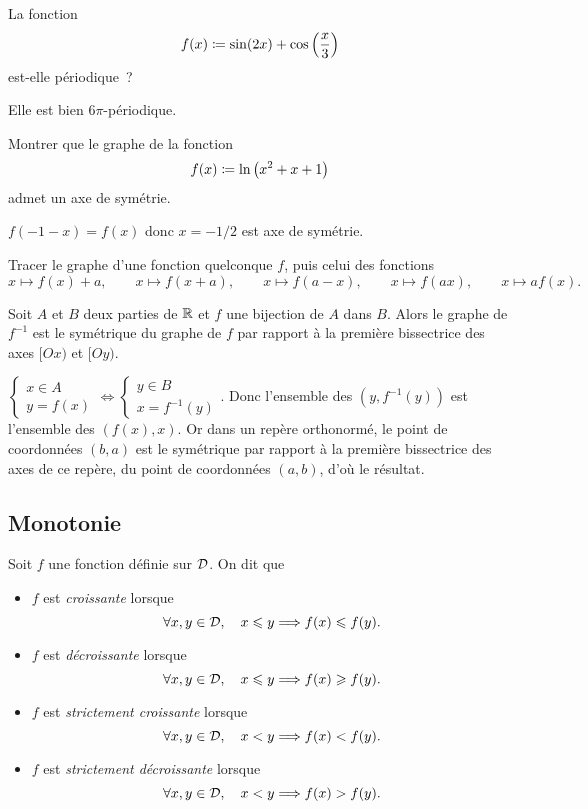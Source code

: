 \documentclass{magnolia}
\begin{document}
\begin{exos}
\exo La fonction
  \[f(x)\coloneqq \sin(2x)+\cos\left(\frac{x}{3}\right)\]
  est-elle périodique~?
\begin{sol}
Elle est bien $6\pi$-périodique.
\end{sol}
\exo Montrer que le graphe de la fonction
  \[f(x)\coloneqq\ln\left(x^2+x+1\right)\]
  admet un axe de symétrie.
  \begin{sol}
$f(-1-x)=f(x)$ donc $x=-1/2$ est axe de symétrie.
\end{sol}
\exo Tracer le graphe d'une fonction quelconque $f$, puis celui des fonctions
 \[x\mapsto f(x)+a, \qquad x\mapsto f(x+a),  \qquad x\mapsto f(a-x), \qquad x\mapsto f(a x), \qquad x\mapsto a f(x).\]
\end{exos}


\begin{proposition}
Soit $A$ et $B$ deux parties de $\mathbb{R}$ et $f$ une bijection de $A$ dans
$B$. Alors le graphe de $f^{-1}$ est le symétrique du graphe de $f$ par
rapport à la première bissectrice des axes $[Ox)$ et $[Oy)$.
\end{proposition}
\begin{preuve}
$\begin{cases}x\in A\\ y=f(x)\end{cases}\Longleftrightarrow \begin{cases}y\in B\\ x=f^{-1}(y)\end{cases}$.
Donc l'ensemble des $(y,f^{-1}(y))$ est l'ensemble des $(f(x),x)$.
Or dans un repère orthonormé, le point de coordonnées $(b,a)$ est le symétrique par rapport à la première bissectrice des axes de ce repère, du point de coordonnées $(a,b)$, d'où le résultat.
\end{preuve}

\subsection{Monotonie}

\begin{definition}[utile=-3]
  Soit $f$ une fonction définie sur $\mathcal{D}$. On dit que
  \begin{itemize}
  \item $f$ est \emph{croissante} lorsque
    $$\forall x,y\in\mathcal{D} ,\quad x\leqslant y \Longrightarrow f(x)\leqslant f(y).$$
  \item $f$ est \emph{décroissante} lorsque
    $$\forall x,y\in\mathcal{D} ,\quad x\leqslant y \Longrightarrow f(x)\geqslant f(y).$$
  \item $f$ est \emph{strictement croissante} lorsque
    $$\forall x,y\in\mathcal{D} ,\quad x< y \Longrightarrow f(x)< f(y).$$
  \item $f$ est \emph{strictement décroissante} lorsque
    $$\forall x,y\in\mathcal{D} ,\quad x< y \Longrightarrow f(x)> f(y).$$
  \end{itemize}
\end{definition}
\end{document}
